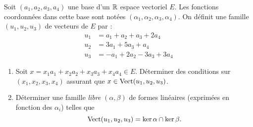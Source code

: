 Soit $(a_1,a_2,a_3,a_4)$ une base d'un $\mathbb{R}$ espace vectoriel $E$. Les fonctions coordonn{\'e}es dans cette base sont not{\'e}es
$(\alpha_1,\alpha_2,\alpha_3,\alpha_4)$.\newline
On d{\'e}finit une famille $(u_1,u_2,u_3)$ de vecteurs de $E$ par :
\[
\begin{aligned}
  u_{1} &=  a_1 + a_2 + a_3 + 2a_4\\
  u_{2} &=  3a_1 + 5a_3 + a_4\\
  u_{3} &=  -a_1 + 2a_2 - 3a_3 + 3a_4
\end{aligned}
\]
\begin{enumerate}
 \item Soit $x=x_1a_1+x_2a_2+x_3a_3+x_4a_4 \in E$. Déterminer des conditions sur $(x_1,x_2,x_3,x_4)$ assurant que $x\in \operatorname{Vect}(u_1,u_2,u_3)$.
 
 \item D{\'e}terminer une famille \emph{libre} $(\alpha,\beta)$ de formes lin{\'e}aires (exprim{\'e}es en fonction des $\alpha_i$) telles que
\[
 \operatorname{Vect}(u_1,u_2,u_3)=\ker \alpha \cap \ker \beta.
\]
\end{enumerate}

